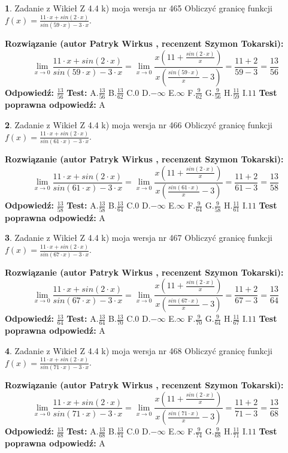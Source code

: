 \documentclass[12pt, a4paper]{article}
\theoremstyle{definition} %
\newtheorem{zad}{}
\newcommand{\zadStart}[1]{\begin{zad}#1\newline}
\newcommand{\zadStop}{\end{zad}}
\newcommand{\rozwStart}[2]{\noindent \textbf{Rozwiązanie (autor #1 , recenzent #2): }\newline}
\newcommand{\rozwStop}{\newline}
\newcommand{\odpStart}{\noindent \textbf{Odpowiedź:}\newline}
\newcommand{\odpStop}{\newline}
\newcommand{\testStart}{\noindent \textbf{Test:}\newline}
\newcommand{\testStop}{\newline}
\newcommand{\kluczStart}{\noindent \textbf{Test poprawna odpowiedź:}\newline}
\newcommand{\kluczStop}{\newline}
\begin{document}
\zadStart{Zadanie z Wikieł Z 4.4 k) moja wersja nr 465}
Obliczyć granicę funkcji $f(x)=\frac{11\cdot x +sin(2\cdot x)}{sin(59\cdot x) -3\cdot x}$.
\zadStop
\rozwStart{Patryk Wirkus}{Szymon Tokarski}
$$\lim\limits_{x\to 0}\frac{11\cdot x +sin(2\cdot x)}{sin(59\cdot x) -3\cdot x}
=\lim\limits_{x\to 0}\frac{x(11+\frac{sin(2\cdot x)}{x})}{x(\frac{sin(59\cdot x)}{x}-3)}
=\frac{11+2}{59-3} = \frac{13}{56}$$
\rozwStop
\odpStart
$\frac{13}{56}$
\odpStop
\testStart
A.$\frac{13}{56}$
B.$\frac{13}{62}$
C.$0$
D.$-\infty$
E.$\infty$
F.$\frac{9}{62}$
G.$\frac{9}{56}$
H.$\frac{11}{59}$
I.$11$
\testStop
\kluczStart
A
\kluczStop



\zadStart{Zadanie z Wikieł Z 4.4 k) moja wersja nr 466}
Obliczyć granicę funkcji $f(x)=\frac{11\cdot x +sin(2\cdot x)}{sin(61\cdot x) -3\cdot x}$.
\zadStop
\rozwStart{Patryk Wirkus}{Szymon Tokarski}
$$\lim\limits_{x\to 0}\frac{11\cdot x +sin(2\cdot x)}{sin(61\cdot x) -3\cdot x}
=\lim\limits_{x\to 0}\frac{x(11+\frac{sin(2\cdot x)}{x})}{x(\frac{sin(61\cdot x)}{x}-3)}
=\frac{11+2}{61-3} = \frac{13}{58}$$
\rozwStop
\odpStart
$\frac{13}{58}$
\odpStop
\testStart
A.$\frac{13}{58}$
B.$\frac{13}{64}$
C.$0$
D.$-\infty$
E.$\infty$
F.$\frac{9}{64}$
G.$\frac{9}{58}$
H.$\frac{11}{61}$
I.$11$
\testStop
\kluczStart
A
\kluczStop



\zadStart{Zadanie z Wikieł Z 4.4 k) moja wersja nr 467}
Obliczyć granicę funkcji $f(x)=\frac{11\cdot x +sin(2\cdot x)}{sin(67\cdot x) -3\cdot x}$.
\zadStop
\rozwStart{Patryk Wirkus}{Szymon Tokarski}
$$\lim\limits_{x\to 0}\frac{11\cdot x +sin(2\cdot x)}{sin(67\cdot x) -3\cdot x}
=\lim\limits_{x\to 0}\frac{x(11+\frac{sin(2\cdot x)}{x})}{x(\frac{sin(67\cdot x)}{x}-3)}
=\frac{11+2}{67-3} = \frac{13}{64}$$
\rozwStop
\odpStart
$\frac{13}{64}$
\odpStop
\testStart
A.$\frac{13}{64}$
B.$\frac{13}{70}$
C.$0$
D.$-\infty$
E.$\infty$
F.$\frac{9}{70}$
G.$\frac{9}{64}$
H.$\frac{11}{67}$
I.$11$
\testStop
\kluczStart
A
\kluczStop



\zadStart{Zadanie z Wikieł Z 4.4 k) moja wersja nr 468}
Obliczyć granicę funkcji $f(x)=\frac{11\cdot x +sin(2\cdot x)}{sin(71\cdot x) -3\cdot x}$.
\zadStop
\rozwStart{Patryk Wirkus}{Szymon Tokarski}
$$\lim\limits_{x\to 0}\frac{11\cdot x +sin(2\cdot x)}{sin(71\cdot x) -3\cdot x}
=\lim\limits_{x\to 0}\frac{x(11+\frac{sin(2\cdot x)}{x})}{x(\frac{sin(71\cdot x)}{x}-3)}
=\frac{11+2}{71-3} = \frac{13}{68}$$
\rozwStop
\odpStart
$\frac{13}{68}$
\odpStop
\testStart
A.$\frac{13}{68}$
B.$\frac{13}{74}$
C.$0$
D.$-\infty$
E.$\infty$
F.$\frac{9}{74}$
G.$\frac{9}{68}$
H.$\frac{11}{71}$
I.$11$
\testStop
\kluczStart
A
\kluczStop
\end{document}
